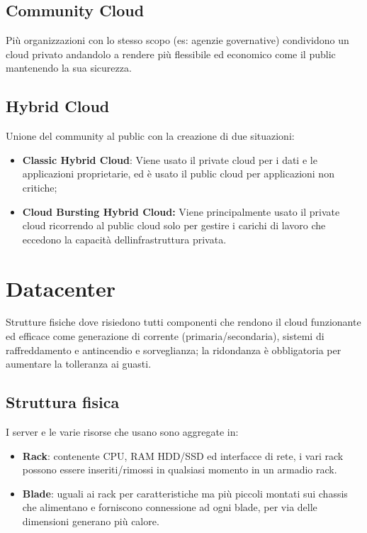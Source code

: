 \subsection{Community Cloud}\label{community-cloud}

Più organizzazioni con lo stesso scopo (es: agenzie governative)
condividono un cloud privato andandolo a rendere più flessibile ed
economico come il public mantenendo la sua sicurezza.

\subsection{Hybrid Cloud}\label{hybrid-cloud}

Unione del community al public con la creazione di due situazioni:

\begin{itemize}
\item
  \textbf{Classic Hybrid Cloud}: Viene usato il private cloud per i dati
  e le applicazioni proprietarie, ed è usato il public cloud per
  applicazioni non critiche;
\item
  \textbf{Cloud Bursting Hybrid Cloud:} Viene principalmente usato il
  private cloud ricorrendo al public cloud solo per gestire i carichi di
  lavoro che eccedono la capacità dell\textquotesingle infrastruttura
  privata.
\end{itemize}

\section{Datacenter}\label{datacenter}

Strutture fisiche dove risiedono tutti componenti che rendono il cloud
funzionante ed efficace come generazione di corrente
(primaria/secondaria), sistemi di raffreddamento e antincendio e
sorveglianza; la ridondanza è obbligatoria per aumentare la tolleranza
ai guasti.

\subsection{Struttura fisica}\label{struttura-fisica}

I server e le varie risorse che usano sono aggregate in:

\begin{itemize}
\item
  \textbf{Rack}: contenente CPU, RAM HDD/SSD ed interfacce di rete, i
  vari rack possono essere inseriti/rimossi in qualsiasi momento in un
  armadio rack.
\item
  \textbf{Blade}: uguali ai rack per caratteristiche ma più piccoli
  montati sui chassis che alimentano e forniscono connessione ad ogni
  blade, per via delle dimensioni generano più calore.
\end{itemize}

